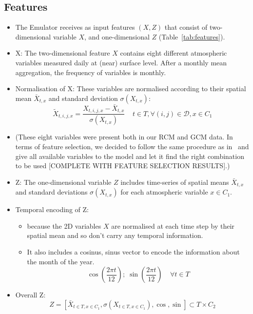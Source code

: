\documentclass[a4paper,11pt,oneside]{report}
\begin{document}
\subsection{Features}
\begin{itemize}
    \item The Emulator receives as input features $(X, Z)$ that consist of two-dimensional variable $X$, and one-dimensional $Z$ (Table~\ref{tab:features}). 
    \item X: The two-dimensional feature $X$ contains eight different atmospheric variables measured daily at (near) surface level. After a monthly mean aggregation, the frequency of variables is monthly.
    \item Normalisation of X: These variables are normalised according to their spatial mean $\bar{X}_{t,x}$ and standard deviation $\sigma(X_{t,x})$:
    \begin{equation}\label{eq:normalisation-X}
    \tilde{X}_{t,i,j,x} = \frac{X_{t,i,j,x}-\bar{X}_{t,x}}{\sigma(X_{t,x})} \;\;\;\; t\in T, \forall (i,j) \in \mathcal{D}, x\in C_1
\end{equation}
    \item (These eight variables were present both in our RCM and GCM data. In terms of feature selection, we decided to follow the same procedure as in~\cite{Doury} and give all available variables to the model and let it find the right combination to be used [COMPLETE WITH FEATURE SELECTION RESULTS].)
    
\item Z: The one-dimensional variable $Z$ includes time-series of spatial means $\bar{X}_{t,x}$ and standard deviations $\sigma(X_{t,x})$ for each atmospheric variable $x\in C_1$.
\item Temporal encoding of Z: 
\begin{itemize}
    \item because the 2D variables $X$ are normalised at each time step by their spatial mean and so don’t carry any temporal information.
    \item It also includes a cosinus, sinus vector to encode the information about the month of the year.
    \begin{equation}
        \operatorname{cos}\left(\frac{2\pi t}{12}\right);\; \operatorname{sin}\left(\frac{2\pi t}{12}\right) \;\;\;\; \forall t\in T
    \end{equation}
\end{itemize}

\item Overall Z: 
\begin{equation}
    Z = \left[ \bar{X}_{t\in T, x\in C_1}, \sigma\left(X_{t\in T, x\in C_1}\right), \operatorname{cos}, \operatorname{sin} \right] \subset T \times C_2
\end{equation}


\end{itemize}
\end{document}
